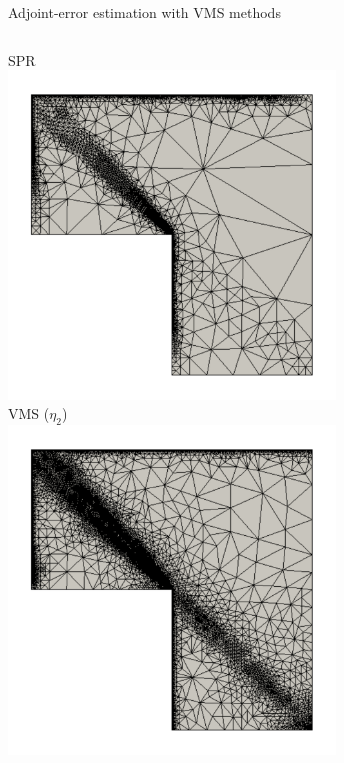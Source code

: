 \documentclass[fleqn]{beamer}
\begin{document}
\begin{frame}{Adjoint-error estimation with VMS methods}
\begin{columns}
\begin{column}{0.5\textwidth}
\centering
SPR  \\
\includegraphics[width=0.65\textwidth]{../img/vms_lshape_global_spr_final.pdf}\\
VMS ($\eta_2$)\\
\includegraphics[width=0.65\textwidth]{../img/vms_lshape_global_vms2_final.pdf}
\end{column}
\end{columns}

\end{frame}

\end{document}
